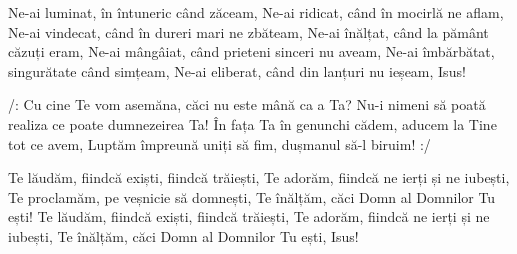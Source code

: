 \beginverse
Ne-ai luminat, în întuneric când zăceam,
Ne-ai ridicat, când în mocirlă ne aflam,
Ne-ai vindecat, când în dureri mari ne zbăteam,
Ne-ai înălțat, când la pământ căzuți eram,
Ne-ai mângâiat, când prieteni sinceri nu aveam,
Ne-ai îmbărbătat, singurătate când simțeam,
Ne-ai eliberat, când din lanțuri nu ieșeam, Isus!
\endverse

\beginchorus
/: Cu cine Te vom asemăna, căci nu este mână ca a Ta?
Nu-i nimeni să poată realiza ce poate dumnezeirea Ta!
În fața Ta în genunchi cădem, aducem la Tine tot ce avem,
Luptăm împreună uniți să fim, dușmanul să-l biruim! :/
\endchorus

\beginverse
Te lăudăm, fiindcă exiști, fiindcă trăiești,
Te adorăm, fiindcă ne ierți și ne iubești,
Te proclamăm, pe veșnicie să domnești,
Te înălțăm, căci Domn al Domnilor Tu ești!
Te lăudăm, fiindcă exiști, fiindcă trăiești,
Te adorăm, fiindcă ne ierți și ne iubești,
Te înălțăm, căci Domn al Domnilor Tu ești, Isus!
\endverse
\endsong